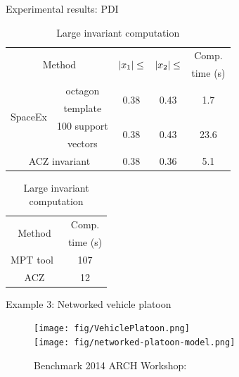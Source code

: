 \begin{frame}{Experimental results: PDI}
\begin{table}
\begin{minipage}{\textwidth}
\center
\caption*{Small invariant computation}
{\small
\begin{tabular}{|l|c|c|c|c|}
\hline
\multicolumn{2}{|c|}{\multirow{2}{*}{Method}} &
\multirow{2}{*}{$\left|x_1\right|\leq$} & \multirow{2}{*}{$\left|x_2\right|\leq$} & Comp.\\
\multicolumn{2}{|c|}{} & & & time (s) \\
\hline
\multirow{4}{*}{SpaceEx} & octagon & \multirow{2}{*}{0.38} &
\multirow{2}{*}{0.43} & \multirow{2}{*}{1.7}\\
& template & & &\\
\cline{2-5}
& 100 support & \multirow{2}{*}{0.38} & \multirow{2}{*}{0.43} & \multirow{2}{*}{23.6}\\
& vectors & & &\\
\hline
\multicolumn{2}{|c|}{\multirow{2}{*}{ACZ invariant}} &
\multirow{2}{*}{0.38} & \multirow{2}{*}{0.36} & 
\multirow{2}{*}{5.1}\\
\multicolumn{2}{|c|}{} & & &\\
\hline
\end{tabular}
}
\end{minipage}
\hspace{4em}
\begin{minipage}{\textwidth}
\center
{\small
\caption*{Large invariant computation}
\begin{tabular}{|c|c|}
\hline
\multirow{2}{*}{Method} & Comp.\\
& time (s)\\
\hline
\multirow{2}{*}{MPT tool~\cite{rakovic2004computation}} & \multirow{2}{*}{107}\\
& \\
\hline
\multirow{2}{*}{ACZ} & \multirow{2}{*}{12}\\
& \\
\hline
\end{tabular}
}
\end{minipage}
\end{table}
\end{frame}

\begin{frame}{Example 3: Networked vehicle platoon}
\begin{figure}
\caption*{\small Benchmark {\color{blue}  2014 ARCH Workshop}: }
\texttt{[image: fig/VehiclePlatoon.png]}\\
\texttt{[image: fig/networked-platoon-model.png]}
\end{figure}
\end{frame}

